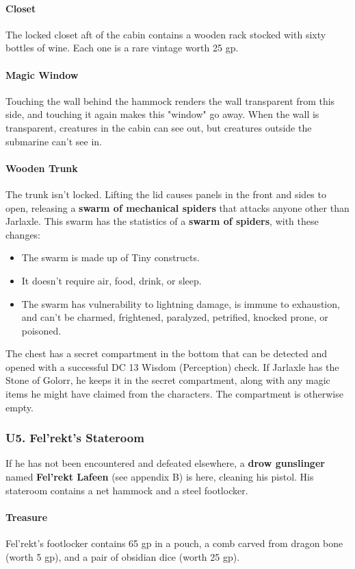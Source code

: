 \documentclass[10pt,a4paper,twoside,twocolumn,openany,nodeprecatedcode]{dndbook}
\begin{document}
\paragraph{Closet}
The locked closet aft of the cabin contains a wooden rack stocked with sixty bottles of wine. Each one is a rare vintage worth 25 gp.
\paragraph{Magic Window}
Touching the wall behind the hammock renders the wall transparent from this side, and touching it again makes this "window" go away. When the wall is transparent, creatures in the cabin can see out, but creatures outside the submarine can't see in.
\paragraph{Wooden Trunk}
The trunk isn't locked. Lifting the lid causes panels in the front and sides to open, releasing a \textbf{swarm of mechanical spiders} that attacks anyone other than Jarlaxle. This swarm has the statistics of a \textbf{swarm of spiders}, with these changes:
\begin{itemize}

\item The swarm is made up of Tiny constructs.
\item It doesn't require air, food, drink, or sleep.
\item The swarm has vulnerability to lightning damage, is immune to exhaustion, and can't be charmed, frightened, paralyzed, petrified, knocked prone, or poisoned.
\end{itemize}


The chest has a secret compartment in the bottom that can be detected and opened with a successful DC 13 Wisdom (Perception) check. If Jarlaxle has the Stone of Golorr, he keeps it in the secret compartment, along with any magic items he might have claimed from the characters. The compartment is otherwise empty.
\subsubsection{U5. Fel'rekt's Stateroom}
If he has not been encountered and defeated elsewhere, a \textbf{drow gunslinger} named \textbf{Fel'rekt Lafeen} (see appendix B) is here, cleaning his pistol. His stateroom contains a net hammock and a steel footlocker.
\paragraph{Treasure}
Fel'rekt's footlocker contains 65 gp in a pouch, a comb carved from dragon bone (worth 5 gp), and a pair of obsidian dice (worth 25 gp).
\end{document}
